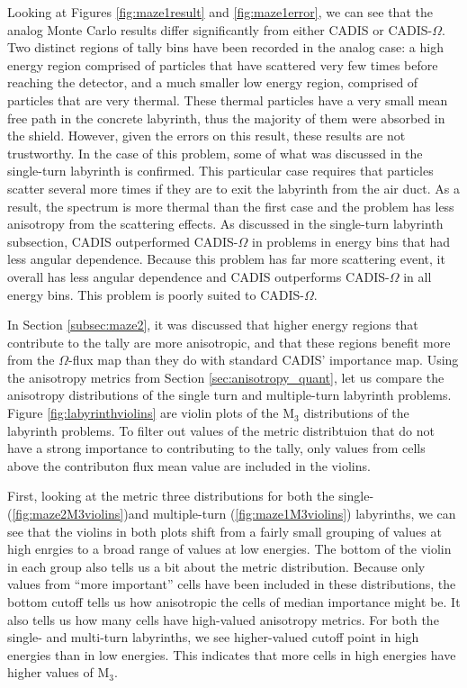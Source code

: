 Looking at Figures \ref{fig:maze1result} and \ref{fig:maze1error}, we can see
that the analog Monte Carlo results differ significantly from either CADIS or
CADIS-$\Omega$. Two distinct regions of tally bins have been recorded in the
analog case: a high energy region comprised of particles that have scattered
very few times before reaching the detector, and a much smaller low energy
region, comprised of particles that are very thermal. These thermal particles
have a very small mean free path in the concrete labyrinth, thus the majority of them were
absorbed in the shield. However, given the errors on this result, these results are
not trustworthy. In the case of this problem, some of what was discussed in the
single-turn labyrinth is confirmed. This particular case requires that particles
scatter several more times if they are to exit the labyrinth from the air duct.
As a result, the spectrum is more thermal than the first case and the problem
has less anisotropy from the scattering effects.
As discussed in the single-turn labyrinth subsection, CADIS
outperformed CADIS-$\Omega$ in problems in energy bins that had less angular
dependence. Because this problem has far more scattering event, it overall has
less angular dependence and CADIS outperforms CADIS-$\Omega$ in all energy bins.
This problem is poorly suited to CADIS-$\Omega$.

In Section \ref{subsec:maze2}, it was discussed that higher energy regions that
contribute to the tally are more anisotropic, and that these regions benefit
more from the $\Omega$-flux map than they do with standard CADIS' importance
map. Using the anisotropy metrics from Section \ref{sec:anisotropy_quant}, let
us compare the anisotropy distributions of the single turn and multiple-turn
labyrinth problems. Figure \ref{fig:labyrinthviolins} are violin plots of the
M$_{3}$ distributions of the labyrinth problems. To filter out values of the
metric distribtuion that do not have a strong importance to contributing to the
tally, only values from cells above the contributon flux mean value are included
in the violins.

First, looking at the metric three distributions for both the single-
(\ref{fig:maze2M3violins})and
multiple-turn (\ref{fig:maze1M3violins}) labyrinths, we can see that the violins
in both plots shift from a fairly small grouping of values at high enrgies to a
broad range of values at low energies. The bottom of the violin in each
group also tells us a
bit about the metric distribution. Because only values from ``more important''
cells have been included in these distributions, the bottom cutoff tells us how
anisotropic the cells of median importance might be. It also tells us how many
cells have high-valued anisotropy metrics. For both the single- and
multi-turn labyrinths, we see higher-valued cutoff point in high energies than
in low energies. This indicates that more cells in high energies have higher
values of M$_3$.

